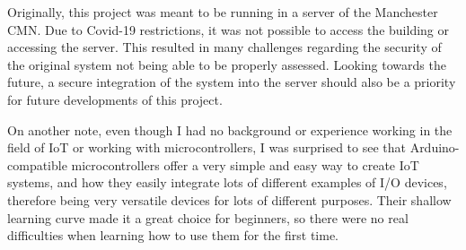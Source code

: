 \documentclass[12pt]{article}
\begin{document}
Originally, this project was meant to be running in a server of the Manchester CMN. Due to Covid-19 restrictions, it was not possible to access the building or accessing the server. This resulted in many challenges regarding the security of the original system not being able to be properly assessed. Looking towards the future, a secure integration of the system into the server should also be a priority for future developments of this project. 

On another note, even though I had no background or experience working in the field of IoT or working with microcontrollers, I was surprised to see that Arduino-compatible microcontrollers offer a very simple and easy way to create IoT systems, and how they easily integrate lots of different examples of I/O devices, therefore being very versatile devices for lots of different purposes. Their shallow learning curve made it a great choice for beginners, so there were no real difficulties when learning how to use them for the first time.\par


\newpage
\printbibliography
\end{document}

